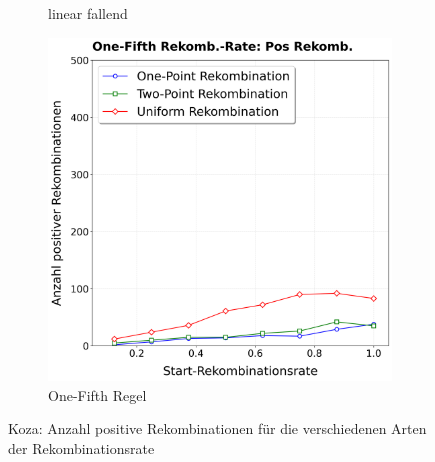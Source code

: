 \begin{figure}[H]
\begin{subfigure}[b]{0.32\textwidth}
		\caption{linear fallend}
		\label{fig:kozaPosRekombinationClegg}
	\end{subfigure}%
	\hfill
	\begin{subfigure}[b]{0.32\textwidth}
		\includegraphics[width=\textwidth]{Bilder/KozaPlotPositiveRekombinationOneFifth.png}
		\caption{One-Fifth Regel}
		\label{fig:kozaPosRekombinationOneFifth}
	\end{subfigure}
	\caption{Koza: Anzahl positive Rekombinationen für die verschiedenen Arten der Rekombinationsrate}
	\label{fig:kozaPosRekombination}
\end{figure}

